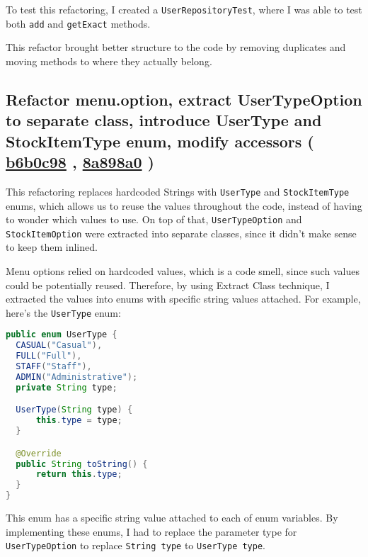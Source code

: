 \documentclass{article}
\newcommand{\code}[1]{\texttt{#1}}
\newcommand{\gh}[1]{%
  \href{https://github.com/awave1/assessment-loan-system/commit/#1}{#1}%
}
\begin{document}
To test this refactoring, I created a \code{UserRepositoryTest}, where I was able to test both \code{add} and \code{getExact} methods.

This refactor brought better structure to the code by removing duplicates and moving methods to where they actually belong.

\subsection*{Refactor menu.option, extract UserTypeOption to separate class, introduce UserType and StockItemType  enum, modify accessors (\gh{b6b0c98}, \gh{8a898a0})}
This refactoring replaces hardcoded Strings with \code{UserType} and \code{StockItemType} enums, which allows us to reuse the values throughout the code, instead of having to wonder which values to use. On top of that, \code{UserTypeOption} and \code{StockItemOption} were extracted into separate classes, since it didn't make sense to keep them inlined.

Menu options relied on hardcoded values, which is a code smell, since such values could be potentially reused. Therefore, by using Extract Class technique, I extracted the values into enums with specific string values attached. For example, here's the \code{UserType} enum:
\begin{lstlisting}[language=Java]
public enum UserType {
  CASUAL("Casual"),
  FULL("Full"),
  STAFF("Staff"),
  ADMIN("Administrative");
  private String type;

  UserType(String type) {
      this.type = type;
  }

  @Override
  public String toString() {
      return this.type;
  }
}
\end{lstlisting}

\noindent This enum has a specific string value attached to each of enum variables. By implementing these enums, I had to replace the parameter type for \code{UserTypeOption} to replace \code{String type} to \code{UserType type}.

\end{document}
